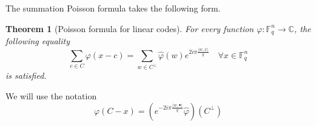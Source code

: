 \documentclass{article}
\newtheorem{theorem}{Theorem}
\begin{document}
The summation Poisson formula takes the following form.
\begin{theorem}[Poisson formula for linear codes]
For every function $\varphi : \mathbb F_q^n \rightarrow \mathbb C$, the following equality 
\[\sum_{c\in C} \varphi(x-c) = \sum_{w\in C^\perp} \hat\varphi(w)e^{2i\pi \frac{\langle w , x\rangle }{q}}\quad\forall x\in \mathbb F_q^n\]
is satisfied.
\end{theorem}
We will use the notation 
\[\varphi (C - x) = \left( e^{-2i\pi \frac{\langle w , \bullet\rangle }{q}}\hat \varphi \right) (C^\perp) \]



\end{document}
